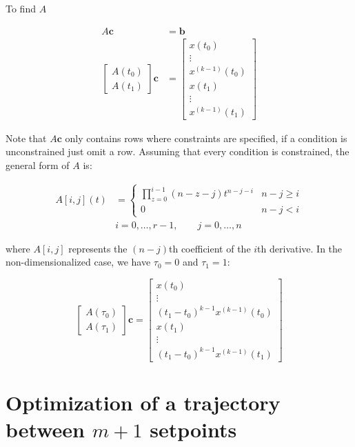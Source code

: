 \noindent To find $A$

\begin{align*}
	A\mathbf{c} &= \mathbf{b} \\
	\begin{bmatrix}
		A(t_0) \\
		A(t_1) 
	\end{bmatrix}
	\mathbf{c} &=
	\begin{bmatrix}
		x(t_0) \\
		\vdots \\
		x^{(k-1)}(t_0) \\
		x(t_1) \\
		\vdots \\
		x^{(k-1)}(t_1)
	\end{bmatrix}
\end{align*}

\noindent Note that $A\mathbf{c}$ only contains rows where constraints are specified, if a condition is unconstrained just omit a row. Assuming that every condition is constrained, the general form of $A$ is:

\begin{align}
	A[i,j](t) &= 
	\begin{cases}
		\prod\limits_{z=0}^{i-1}(n-z-j)t^{n-j-i} & n-j \ge i \\
		0 & n-j<i
	\end{cases} \\
	& i=0,\dots,r-1, \qquad j=0,\dots,n \nonumber
\end{align}

\noindent where $A[i,j]$ represents the $(n-j)$th coefficient of the $i$th derivative. In the non-dimensionalized case, we have $\tau_0=0$ and $\tau_1=1$:

\begin{equation}
	\begin{bmatrix}
		A(\tau_0) \\
		A(\tau_1) 
	\end{bmatrix}
	\mathbf{c} =
	\begin{bmatrix}
		x(t_0) \\
		\vdots \\
		(t_1-t_0)^{k-1}x^{(k-1)}(t_0) \\
		x(t_1) \\
		\vdots \\
		(t_1-t_0)^{k-1}x^{(k-1)}(t_1)
	\end{bmatrix}
\end{equation}


\section{Optimization of a trajectory between $m+1$ setpoints}

